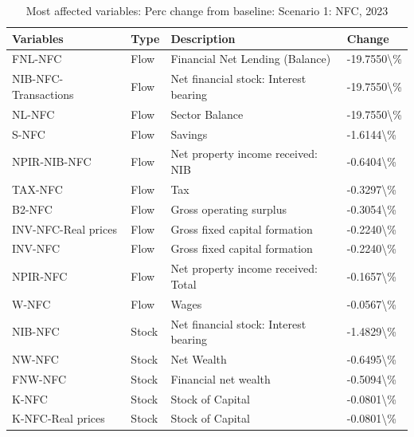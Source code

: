 \documentclass[
]{book}
\begin{document}
\begin{table}

\caption{\label{tab:most-affected-scenario-1-perc-2023-NFC}Most affected variables: Perc change from baseline: Scenario 1: NFC, 2023}
\centering
\fontsize{10}{12}\selectfont
\begin{tabular}[t]{l|l|l|l}
\hline
Variables & Type & Description & Change\\
\hline
FNL-NFC & Flow & Financial Net Lending (Balance) & -19.7550\textbackslash{}\%\\
\hline
NIB-NFC-Transactions & Flow & Net financial stock: Interest bearing & -19.7550\textbackslash{}\%\\
\hline
NL-NFC & Flow & Sector Balance & -19.7550\textbackslash{}\%\\
\hline
S-NFC & Flow & Savings & -1.6144\textbackslash{}\%\\
\hline
NPIR-NIB-NFC & Flow & Net property income received: NIB & -0.6404\textbackslash{}\%\\
\hline
TAX-NFC & Flow & Tax & -0.3297\textbackslash{}\%\\
\hline
B2-NFC & Flow & Gross operating surplus & -0.3054\textbackslash{}\%\\
\hline
INV-NFC-Real prices & Flow & Gross fixed capital formation & -0.2240\textbackslash{}\%\\
\hline
INV-NFC & Flow & Gross fixed capital formation & -0.2240\textbackslash{}\%\\
\hline
NPIR-NFC & Flow & Net property income received: Total & -0.1657\textbackslash{}\%\\
\hline
W-NFC & Flow & Wages & -0.0567\textbackslash{}\%\\
\hline
NIB-NFC & Stock & Net financial stock: Interest bearing & -1.4829\textbackslash{}\%\\
\hline
NW-NFC & Stock & Net Wealth & -0.6495\textbackslash{}\%\\
\hline
FNW-NFC & Stock & Financial net wealth & -0.5094\textbackslash{}\%\\
\hline
K-NFC & Stock & Stock of Capital & -0.0801\textbackslash{}\%\\
\hline
K-NFC-Real prices & Stock & Stock of Capital & -0.0801\textbackslash{}\%\\
\hline
\end{tabular}
\end{table}
\end{document}
